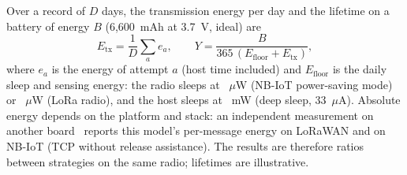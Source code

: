 Over a record of $D$ days, the transmission energy per day and the lifetime on a battery of energy $B$ (6{,}600~mAh at 3.7~V, ideal) are
\begin{equation}
E_\mathrm{tx}=\frac{1}{D}\sum_{a} e_a,\qquad Y=\frac{B}{365\,(E_\mathrm{floor}+E_\mathrm{tx})},
\label{eq:energy}
\end{equation}
where $e_a$ is the energy of attempt $a$ (host time included) and $E_\mathrm{floor}$ is the daily sleep and sensing energy: the radio sleeps at \nbPsmUW~$\mu$W (NB-IoT power-saving mode) or \loraSleepUW~$\mu$W (LoRa radio), and the host sleeps at \hostSleepMW~mW (deep sleep, 33~$\mu$A). Absolute energy depends on the platform and stack: an independent measurement on another board~\cite{ugwuanyi2021developing} reports \ugwLoraRatio{} this model's per-message energy on LoRaWAN and \ugwNbRatio{} on NB-IoT (TCP without release assistance). The results are therefore ratios between strategies on the same radio; lifetimes are illustrative.

